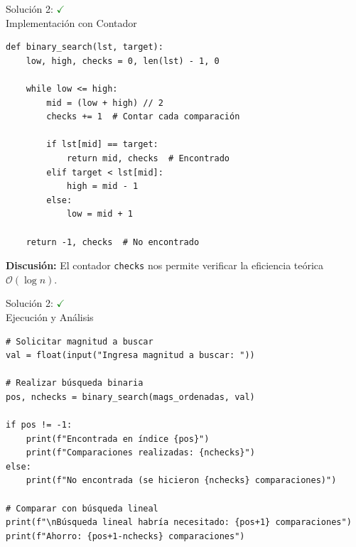 \documentclass[10pt]{beamer}
\begin{document}
\begin{solutionblock}
\begin{frame}[fragile]{Solución 2: \hfill \textcolor{green}{$\checkmark$} \\ Implementación con Contador}
\begin{verbatim}
def binary_search(lst, target):
    low, high, checks = 0, len(lst) - 1, 0
    
    while low <= high:
        mid = (low + high) // 2
        checks += 1  # Contar cada comparación
        
        if lst[mid] == target:
            return mid, checks  # Encontrado
        elif target < lst[mid]:
            high = mid - 1
        else:
            low = mid + 1
    
    return -1, checks  # No encontrado
\end{verbatim}

\textbf{Discusión:} El contador \texttt{checks} nos permite verificar la eficiencia teórica $\mathcal{O}(\log n)$.
\end{frame}
\end{solutionblock}

\begin{solutionblock}
\begin{frame}[fragile]{Solución 2: \hfill \textcolor{green}{$\checkmark$} \\ Ejecución y Análisis}
\begin{verbatim}
# Solicitar magnitud a buscar
val = float(input("Ingresa magnitud a buscar: "))

# Realizar búsqueda binaria
pos, nchecks = binary_search(mags_ordenadas, val)

if pos != -1:
    print(f"Encontrada en índice {pos}")
    print(f"Comparaciones realizadas: {nchecks}")
else:
    print(f"No encontrada (se hicieron {nchecks} comparaciones)")

# Comparar con búsqueda lineal
print(f"\nBúsqueda lineal habría necesitado: {pos+1} comparaciones")
print(f"Ahorro: {pos+1-nchecks} comparaciones")
\end{verbatim}
\end{frame}
\end{solutionblock}
\end{document}
